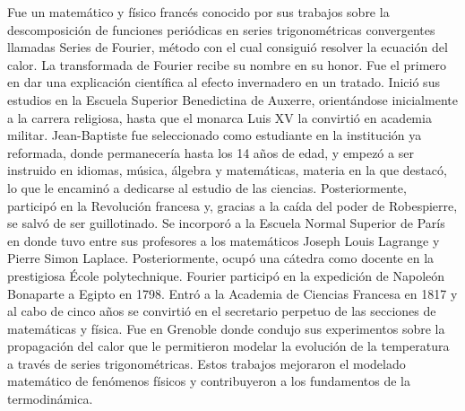 
\begin{parchment}{ Fue un matemático y físico francés conocido por sus trabajos sobre la descomposición de funciones periódicas en series trigonométricas convergentes llamadas Series de Fourier, método con el cual consiguió resolver la ecuación del calor. La transformada de Fourier recibe su nombre en su honor. Fue el primero en dar una explicación científica al efecto invernadero en un tratado.
Inició sus estudios en la Escuela Superior Benedictina de Auxerre, orientándose inicialmente a la carrera religiosa, hasta que el monarca Luis XV la convirtió en academia militar. Jean-Baptiste fue seleccionado como estudiante en la institución ya reformada, donde permanecería hasta los 14 años de edad, y empezó a ser instruido en idiomas, música, álgebra y matemáticas, materia en la que destacó, lo que le encaminó a dedicarse al estudio de las ciencias.
Posteriormente, participó en la Revolución francesa y, gracias a la caída del poder de Robespierre, se salvó de ser guillotinado. Se incorporó a la Escuela Normal Superior de París en donde tuvo entre sus profesores a los matemáticos Joseph Louis Lagrange y Pierre Simon Laplace. Posteriormente, ocupó una cátedra como docente en la prestigiosa École polytechnique.
Fourier participó en la expedición de Napoleón Bonaparte a Egipto en 1798. 
Entró a la Academia de Ciencias Francesa en 1817 y al cabo de cinco años se convirtió en el secretario perpetuo de las secciones de matemáticas y física.
Fue en Grenoble donde condujo sus experimentos sobre la propagación del calor que le permitieron modelar la evolución de la temperatura a través de series trigonométricas. Estos trabajos mejoraron el modelado matemático de fenómenos físicos y contribuyeron a los fundamentos de la termodinámica.
}
\end{parchment}
